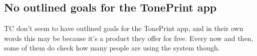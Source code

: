 \subsection*{No outlined goals for the TonePrint app} 
\label{App:ThemeNoClearGoalsForTheToneprintApp}
TC don't seem to have outlined goals for the TonePrint app, and in their own words this may be because it's a product they offer for free. Every now and then, some of them do check how many people are using the system though.